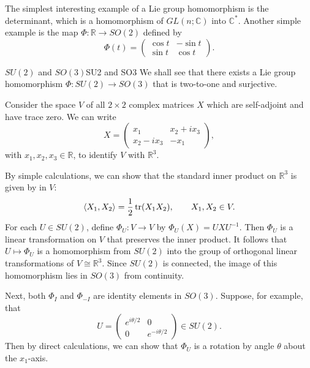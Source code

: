\documentclass[../main.tex]{subfiles}
\begin{document}
The simplest interesting example of a Lie group homomorphism is the determinant, which is a homomorphism of $GL(n;\mathbb{C})$ into $\mathbb{C}^*$. Another simple example is the map $\Phi: \mathbb{R} \to SO(2)$ defined by
\begin{equation*}
	\Phi(t) = \begin{pmatrix}
		\cos t & -\sin t \\
		\sin t & \cos t
	\end{pmatrix}.
\end{equation*}

\begin{example}{$SU(2)$ and $SO(3)$}{SU2 and SO3}
	We shall see that there exists a Lie group homomorphism $\Phi: SU(2) \to SO(3)$ that is two-to-one and surjective.

	Consider the space $V$ of all $2 \times 2$ complex matrices $X$ which are self-adjoint and have trace zero. We can write
	\begin{equation}
		X = \begin{pmatrix}
			x_1 & x_2 + i x_3 \\
			x_2 - i x_3 & -x_1
		\end{pmatrix},
	\end{equation}
	with $x_1, x_2, x_3 \in \mathbb{R}$, to identify $V$ with $\mathbb{R}^3$.

	By simple calculations, we can show that the standard inner product on $\mathbb{R}^3$ is given by in $V$:
	\begin{equation}
		\langle X_1, X_2 \rangle = \frac{1}{2} \operatorname{tr}(X_1 X_2), \qquad X_1, X_2 \in V.
	\end{equation}
	For each $U \in SU(2)$, define $\Phi_U: V \to V$ by $\Phi_U(X) = U X U^{-1}$. Then $\Phi_U$ is a linear transformation on $V$ that preserves the inner product. It follows that $U \mapsto \Phi_U$ is a homomorphism from $SU(2)$ into the group of orthogonal linear transformations of $V \cong \mathbb{R}^3$. Since $SU(2)$ is connected, the image of this homomorphism lies in $SO(3)$ from continuity.

	Next, both $\Phi_I$ and $\Phi_{-I}$ are identity elements in $SO(3)$. Suppose, for example, that
	\begin{equation}
		U = \begin{pmatrix}
			e^{i \theta / 2} & 0 \\
			0 & e^{-i \theta / 2}
		\end{pmatrix} \in SU(2).
	\end{equation}
	Then by direct calculations, we can show that $\Phi_U$ is a rotation by angle $\theta$ about the $x_1$-axis.
\end{example}
\end{document}
